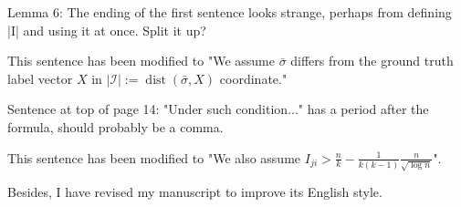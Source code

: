\documentclass[answers]{exam}
\newcommand{\cI}{\mathcal{I}}
\DeclareMathOperator{\Dist}{dist}
\begin{document}
\begin{questions}
\question Lemma 6: The ending of the first sentence looks strange, perhaps from defining |I| and using it at once. Split it up?
\begin{solution}
This sentence has been modified to "We assume $\bar{\sigma}$ differs from the ground truth label vector $X$ in $|\cI|:=\Dist(\bar{\sigma}, X)$ coordinate."
\end{solution}
\question Sentence at top of page 14: "Under such condition..." has a period after the formula, should probably be a comma.
\begin{solution}
	This sentence has been modified to "We also assume $I_{ji} > \frac{n}{k} - \frac{1}{k(k-1)}\frac{n}{\sqrt{\log n}}$".
\end{solution}
\end{questions}
Besides, I have revised my manuscript to improve its English style.
\end{document}
